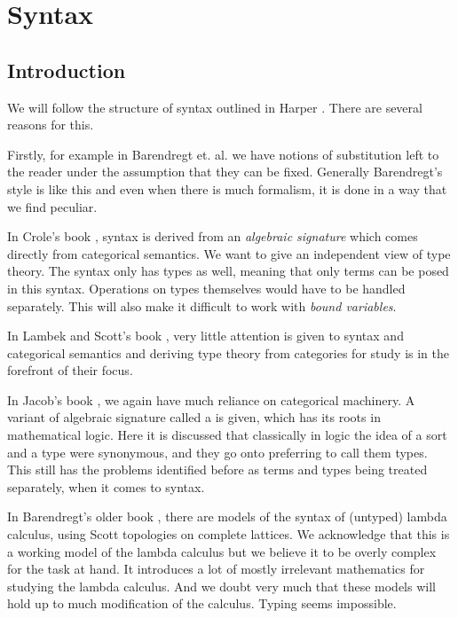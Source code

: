 
\section{Syntax}

\subsection{Introduction}


We will follow the structure of syntax outlined in Harper \cite{harper_2016}. There are several reasons for this. 

Firstly, for example in Barendregt et. al. \cite{BarendregtHenk2013Lcwt} we have notions of substitution left to the reader under the assumption that they can be fixed. Generally Barendregt's style is like this and even when there is much formalism, it is done in a way that we find peculiar.

In Crole's book \cite{CroleRoyL1993Cft}, syntax is derived from an \textit{algebraic signature} which comes directly from categorical semantics. We want to give an independent view of type theory. The syntax only has types as well, meaning that only terms can be posed in this syntax. Operations on types themselves would have to be handled separately. This will also make it difficult to work with \textit{bound variables}.

In Lambek and Scott's book \cite{LambekJ1986Itho}, very little attention is given to syntax and categorical semantics and deriving type theory from categories for study is in the forefront of their focus.

In Jacob's book \cite{JacobsCLTT}, we again have much reliance on categorical machinery. A variant of algebraic signature called a  is given, which has its roots in mathematical logic. Here it is discussed that classically in logic the idea of a sort and a type were synonymous, and they go onto preferring to call them types. This still has the problems identified before as terms and types being treated separately, when it comes to syntax.

In Barendregt's older book \cite{barendregt1984lambda}, there are models of the syntax of (untyped) lambda calculus, using Scott topologies on complete lattices. We acknowledge that this is a working model of the lambda calculus but we believe it to be overly complex for the task at hand. It introduces a lot of mostly irrelevant mathematics for studying the lambda calculus. And we doubt very much that these models will hold up to much modification of the calculus. Typing seems impossible.

